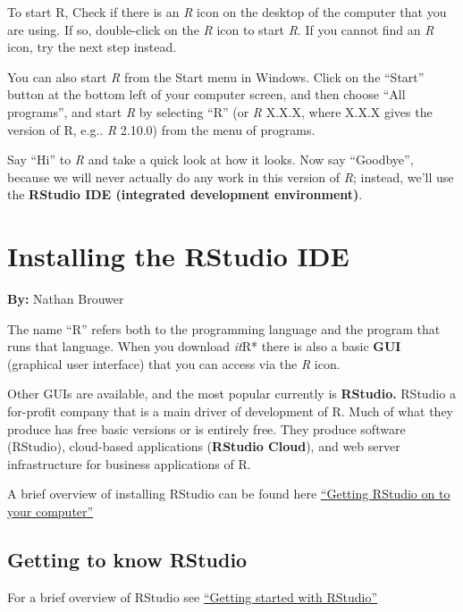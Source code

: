\documentclass[
]{book}
\begin{document}
To start R, Check if there is an \emph{R} icon on the desktop of the computer that you are using. If so, double-click on the \emph{R} icon to start \emph{R}. If you cannot find an \emph{R} icon, try the next step instead.

You can also start \emph{R} from the Start menu in Windows. Click on the ``Start'' button at the bottom left of your computer screen, and then choose ``All programs'', and start \emph{R} by selecting ``R'' (or \emph{R} X.X.X, where X.X.X gives the version of R, e.g.. \emph{R} 2.10.0) from the menu of programs.

Say ``Hi'' to \emph{R} and take a quick look at how it looks. Now say ``Goodbye'', because we will never actually do any work in this version of \emph{R}; instead, we'll use the \textbf{RStudio IDE (integrated development environment)}.

\hypertarget{installing-the-rstudio-ide}{%
\chapter{Installing the RStudio IDE}\label{installing-the-rstudio-ide}}

\textbf{By:} Nathan Brouwer

The name ``R'' refers both to the programming language and the program that runs that language. When you download \emph{it}R* there is also a basic \textbf{GUI} (graphical user interface) that you can access via the \emph{R} icon.

Other GUIs are available, and the most popular currently is \textbf{RStudio.} RStudio a for-profit company that is a main driver of development of R. Much of what they produce has free basic versions or is entirely free. They produce software (RStudio), cloud-based applications (\textbf{RStudio Cloud}), and web server infrastructure for business applications of R.

A brief overview of installing RStudio can be found here \href{https://brouwern.github.io/BOOK_R_Ecological_Data_Science/getting-rstudio-on-to-your-computer.html}{``Getting RStudio on to your computer''}

\hypertarget{getting-to-know-rstudio}{%
\section{Getting to know RStudio}\label{getting-to-know-rstudio}}

For a brief overview of RStudio see \href{https://brouwern.github.io/BOOK_R_Ecological_Data_Science/getting-started-with-rstudio.html}{``Getting started with RStudio''}
\end{document}
